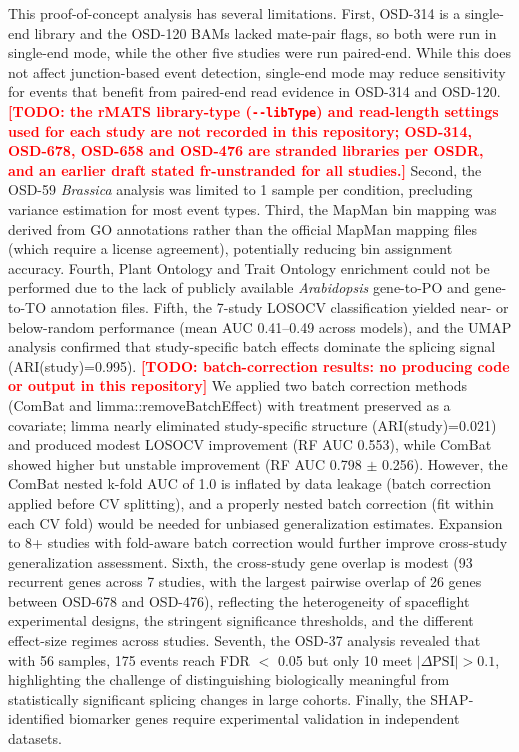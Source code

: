 \documentclass[12pt,a4paper]{article}
\newcommand{\TODO}[1]{\textcolor{red}{\textbf{[TODO: #1]}}}
\begin{document}
This proof-of-concept analysis has several limitations. First, OSD-314 is a single-end library and the OSD-120 BAMs lacked mate-pair flags, so both were run in single-end mode, while the other five studies were run paired-end. While this does not affect junction-based event detection, single-end mode may reduce sensitivity for events that benefit from paired-end read evidence in OSD-314 and OSD-120. \TODO{the rMATS library-type (\texttt{-{}-libType}) and read-length settings used for each study are not recorded in this repository; OSD-314, OSD-678, OSD-658 and OSD-476 are stranded libraries per OSDR, and an earlier draft stated fr-unstranded for all studies.} Second, the OSD-59 \textit{Brassica} analysis was limited to 1 sample per condition, precluding variance estimation for most event types. Third, the MapMan bin mapping was derived from GO annotations rather than the official MapMan mapping files (which require a license agreement), potentially reducing bin assignment accuracy. Fourth, Plant Ontology and Trait Ontology enrichment could not be performed due to the lack of publicly available \textit{Arabidopsis} gene-to-PO and gene-to-TO annotation files. Fifth, the 7-study LOSOCV classification yielded near- or below-random performance (mean AUC 0.41--0.49 across models), and the UMAP analysis confirmed that study-specific batch effects dominate the splicing signal (ARI(study)=0.995). \TODO{batch-correction results: no producing code or output in this repository} We applied two batch correction methods (ComBat and limma::removeBatchEffect) with treatment preserved as a covariate; limma nearly eliminated study-specific structure (ARI(study)=0.021) and produced modest LOSOCV improvement (RF AUC 0.553), while ComBat showed higher but unstable improvement (RF AUC 0.798 $\pm$ 0.256). However, the ComBat nested k-fold AUC of 1.0 is inflated by data leakage (batch correction applied before CV splitting), and a properly nested batch correction (fit within each CV fold) would be needed for unbiased generalization estimates. Expansion to 8+ studies with fold-aware batch correction would further improve cross-study generalization assessment. Sixth, the cross-study gene overlap is modest (93 recurrent genes across 7 studies, with the largest pairwise overlap of 26 genes between OSD-678 and OSD-476), reflecting the heterogeneity of spaceflight experimental designs, the stringent significance thresholds, and the different effect-size regimes across studies. Seventh, the OSD-37 analysis revealed that with 56 samples, 175 events reach FDR $<$ 0.05 but only 10 meet $|\Delta\text{PSI}| > 0.1$, highlighting the challenge of distinguishing biologically meaningful from statistically significant splicing changes in large cohorts. Finally, the SHAP-identified biomarker genes require experimental validation in independent datasets.
\end{document}
